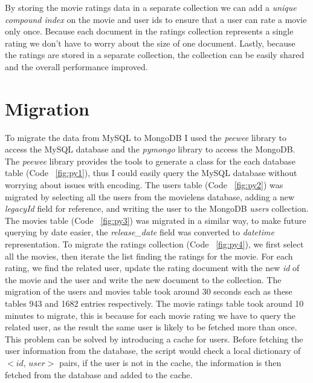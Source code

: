 \documentclass[a4paper, titlepage, 11pt]{article}
\begin{document}
By storing the movie ratings data in a separate collection we can add a \textit{unique compound index} on the movie and user ids to ensure that a user can rate a movie only once. Because each document in the ratings collection represents a single rating we don't have to worry about the size of one document. Lastly, because the ratings are stored in a separate collection, the collection can be easily shared and the overall performance improved.
\section{Migration}
To migrate the data from MySQL to MongoDB I used the \textit{peewee} library to access the MySQL database and the \textit{pymongo} library to access the MongoDB. The \textit{peewee} library provides the tools to generate a class for the each database table (Code ~\ref{fig:py1}), thus I could easily query the MySQL database without worrying about issues with encoding. The users table (Code ~\ref{fig:py2}) was migrated by selecting all the users from the movielens database, adding a new \textit{legacyId} field for reference, and writing the user to the MongoDB \textit{users} collection. The movies table (Code ~\ref{fig:py3}) was migrated in a similar way, to make future querying by date easier, the \textit{release\_date} field was converted to \textit{datetime} representation. To migrate the ratings collection (Code ~\ref{fig:py4}), we first select all the movies, then iterate the list finding the ratings for the movie. For each rating, we find the related user, update the rating document with the new \textit{id} of the movie and the user and write the new document to the collection. The migration of the users and movies table took around 30 seconds each as these tables 943 and 1682 entries respectively. The movie ratings table took around 10 minutes to migrate, this is because for each movie rating we have to query the related user, as the result the same user is likely to be fetched more than once. This problem can be solved by introducing a cache for users. Before fetching the user information from the database, the script would check a local dictionary of $<id$, $user>$ pairs, if the user is not in the cache, the information is then fetched from the database and added to the cache.
\end{document}
